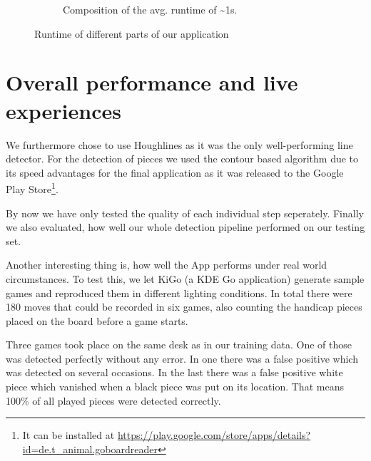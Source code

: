 \begin{figure}
\begin{subfigure}{0.25\textwidth}
\begin{tikzpicture}
			\end{tikzpicture}
			\vspace{1.5em}
			\caption{Composition of the avg. runtime of \textasciitilde1s.}
			\label{fig:timeEvaluation-pie}
		\end{subfigure}

		\caption{Runtime of different parts of our application}
		\label{fig:timeEvaluation}
	\end{figure}




	\section{Overall performance and live experiences}
	\label{evaluation-overallPerformance}
	We furthermore chose to use Houghlines as it was the only well-performing line detector. For the detection of pieces we used the contour based algorithm due to its speed advantages for the final application as it was released to the Google Play Store\footnote{It can be installed at \url{https://play.google.com/store/apps/details?id=de.t_animal.goboardreader}}.

	By now we have only tested the quality of each individual step seperately. Finally we also evaluated, how well our whole detection pipeline performed on our testing set.

	Another interesting thing is, how well the App performs under real world circumstances. To test this, we let KiGo (a KDE Go application) generate sample games and reproduced them in different lighting conditions. In total there were 180 moves that could be recorded in six games, also counting the handicap pieces placed on the board before a game starts.

	Three games took place on the same desk as in our training data. One of those was detected perfectly without any error. In one there was a false positive which was detected on several occasions. In the last there was a false positive white piece which vanished when a black piece was put on its location. That means 100\% of all played pieces were detected correctly.

